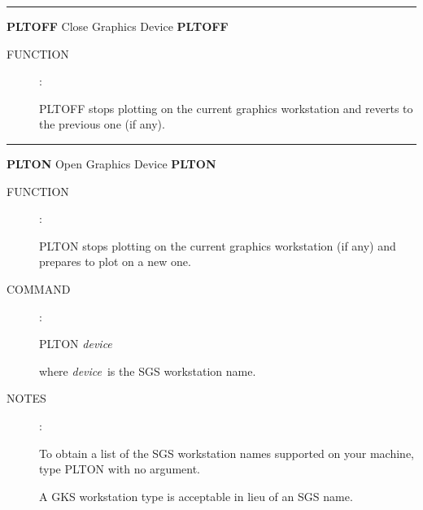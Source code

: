 
\goodbreak
\rule{\textwidth}{0.3mm}
{\Large {\bf PLTOFF} \hfill Close Graphics Device \hfill {\bf PLTOFF}}
\begin{description}
\item [FUNCTION]:

PLTOFF stops plotting on the current graphics
workstation and reverts to the previous one (if any).

\end{description}


\goodbreak
\rule{\textwidth}{0.3mm}
{\Large {\bf PLTON} \hfill Open Graphics Device \hfill {\bf PLTON}}
\begin{description}
\item [FUNCTION]:

PLTON stops plotting on the current graphics
workstation (if any) and prepares to plot on a new one.

\item [COMMAND]:

\begin{cmd}
\> \> PLTON {\it device}
\end{cmd}

where {\it device}\, is the SGS workstation name.

\item [NOTES]:

To obtain a list of the SGS workstation names supported on
your machine, type PLTON with no argument.

A GKS workstation
type is acceptable in lieu of an SGS name.

\end{description}


